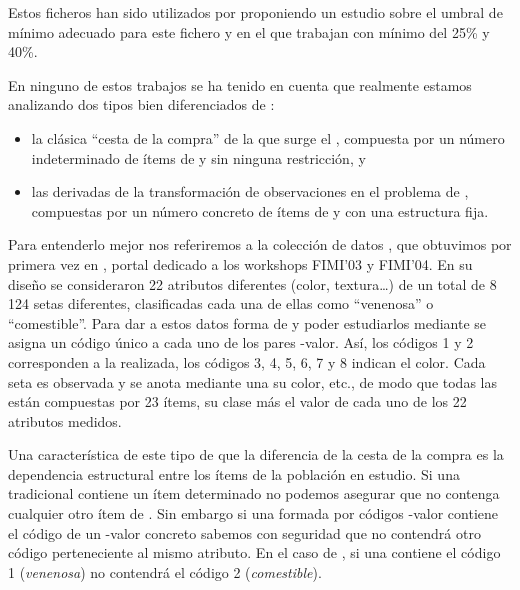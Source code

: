 Estos ficheros han sido utilizados por \citet{JinMcCallenBreitbartFuhryWang-EstimatingTheNumberOfFIInLargeDB-2009} proponiendo un estudio sobre el umbral de \soporte mínimo adecuado para este fichero y en el que trabajan con \soporte mínimo del 25\% y 40\%.

En ninguno de estos trabajos se ha tenido en cuenta que realmente estamos analizando dos tipos bien diferenciados de \transacciones:
\begin{itemize}
  \item la clásica "`cesta de la compra"' de la que surge el \ARM, compuesta por un número indeterminado de ítems de \I y sin ninguna restricción, y
  \item las \transacciones derivadas de la transformación de observaciones en el problema de \Clasificacion, compuestas por un número concreto de ítems de \I y con una estructura fija.
\end{itemize}

Para entenderlo mejor nos referiremos a la colección de datos \mushroom, que obtuvimos por primera vez en , portal dedicado a los workshops FIMI'03 y FIMI'04. En su diseño se consideraron 22 atributos diferentes (color, textura\ldots) de un total de 8\,124 setas diferentes, clasificadas cada una de ellas como "`venenosa"' o "`comestible"'. Para dar a estos datos forma de \transaccion y poder estudiarlos mediante \ARM se asigna un código único a cada uno de los pares \atributo-valor. Así, los códigos 1 y 2 corresponden a la \clasificacion realizada, los códigos 3, 4, 5, 6, 7 y 8 indican el color. Cada seta es observada y se anota mediante una \transaccion su color, etc., de modo que todas las \transacciones están compuestas por 23 ítems, su clase más el valor de cada uno de los 22 atributos medidos.

Una característica de este tipo de \transaccion que la diferencia de la cesta de la compra es la dependencia estructural entre los ítems de la población en estudio. Si una \transaccion tradicional contiene un ítem determinado no podemos asegurar que no contenga cualquier otro ítem de \I. Sin embargo si una \transaccion formada por códigos \atributo-valor contiene el código de un \atributo-valor concreto sabemos con seguridad que no contendrá otro código perteneciente al mismo atributo. En el caso de \mushroom, si una \transaccion contiene el código 1 (\emph{venenosa}) no contendrá el código 2 (\emph{comestible}).

